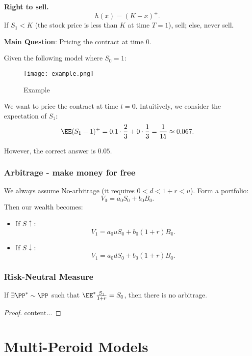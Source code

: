 \begin{exap}
	\textbf{Right to sell.}
	$$h(x) = (K - x)^+.$$
	If $S_1 < K$ (the stock price is less than $K$ at time $T=1$), sell; else, never sell.
\end{exap}

\begin{tcolorbox}
	\begin{center}
		\textbf{Main Question}: Pricing the contract at time $0$.
	\end{center}
\end{tcolorbox}

\begin{exap}
Given the following model where $S_0=1$:
\begin{figure}[H]
	\centering
	\texttt{[image: example.png]}
	\caption{Example}
\end{figure}

We want to price the contract at time $t=0$. Intuitively, we consider the expectation of $S_1$:
$$\EE( S_1 - 1)^+ = 0.1 \cdot\frac{2}{3} + 0\cdot\frac{1}{3} = \frac{1}{15} \approx 0.067.$$

However, the correct answer is $0.05$. 

\end{exap}

\subsubsection*{Arbitrage - make money for free} 
	We always assume No-arbitrage (it requires $0<d<1+r<u$). Form a portfolio:
	$$V_0 = a_0 S_0 + b_0 B_0.$$ 
Then our wealth becomes:
\begin{itemize}
	\item If $S \uparrow$:
	$$V_1 = a_0 uS_0 + b_0(1+r)B_0.$$
	\item If $S \downarrow$:
	$$V_1 = a_0 dS_0 + b_0(1+r)B_0.$$
\end{itemize}

\subsubsection*{Risk-Neutral Measure}
\begin{tcolorbox} 
		\begin{thm}
			If $\exists \PP^\ast \sim \PP$ such that $\EE^\ast \frac{S_1}{1+r} = S_0$, then there is no arbitrage. 
		\end{thm} 
\end{tcolorbox}
\begin{proof}
	content...
\end{proof}

\section{Multi-Peroid Models}
